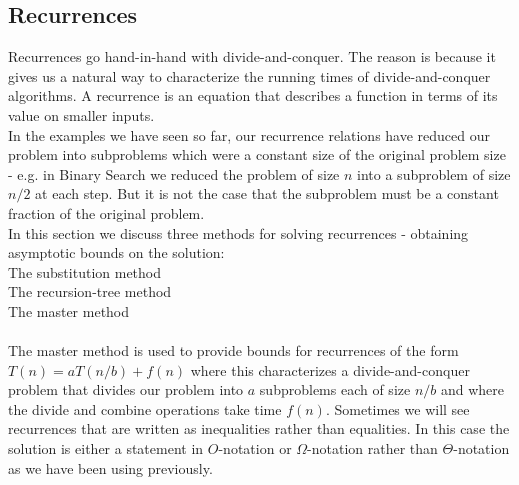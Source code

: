\documentclass{scrartcl}
\theoremstyle{definition}
\theoremstyle{definition}
\theoremstyle{remark}
\numberwithin{equation}{section}
\begin{document}
\subsection{Recurrences}
Recurrences go hand-in-hand with divide-and-conquer. The reason is because it gives us a natural way to characterize the running times of divide-and-conquer algorithms. A recurrence is an equation that describes a function in terms of its value on smaller inputs.\\
In the examples we have seen so far, our recurrence relations have reduced our problem into subproblems which were a constant size of the original problem size - e.g. in Binary Search we reduced the problem of size $n$ into a subproblem of size $n/2$ at each step. But it is not the case that the subproblem must be a constant fraction of the original problem.\\
In this section we discuss three methods for solving recurrences - obtaining asymptotic bounds on the solution:\\
The substitution method\\
The recursion-tree method\\
The master method
\\
\\

The master method is used to provide bounds for recurrences of the form $T(n)=aT(n/b) + f(n)$ where this characterizes a divide-and-conquer problem that divides our problem into $a$ subproblems each of size $n/b$ and where the divide and combine operations take time $f(n)$. Sometimes we will see recurrences that are written as inequalities rather than equalities. In this case the solution is either a statement in $O$-notation or $\Omega$-notation rather than $\Theta$-notation as we have been using previously.\\
\\
\end{document}
